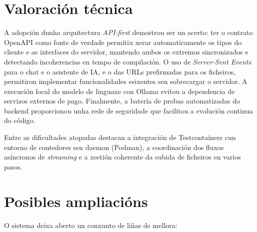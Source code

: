 \section{Valoración técnica}

A adopción dunha arquitectura \textit{API-first} demostrou ser un acerto: ter o contrato
OpenAPI como fonte de verdade permitiu xerar automaticamente os tipos do cliente e as
interfaces do servidor, mantendo ambos os extremos sincronizados e detectando
incoherencias en tempo de compilación. O uso de \textit{Server-Sent Events} para o chat e
o asistente de IA, e o das URLs prefirmadas para os ficheiros, permitiron implementar
funcionalidades esixentes sen sobrecargar o servidor. A execución local do modelo de
linguaxe con Ollama evitou a dependencia de servizos externos de pago. Finalmente, a
batería de probas automatizadas do backend proporcionou unha rede de seguridade que
facilitou a evolución continua do código.

Entre as dificultades atopadas destacan a integración de Testcontainers cun entorno de
contedores sen daemon (Podman), a coordinación dos fluxos asíncronos de \textit{streaming}
e a xestión coherente da subida de ficheiros en varios pasos.

\section{Posibles ampliacións}

O sistema deixa aberto un conxunto de liñas de mellora:

